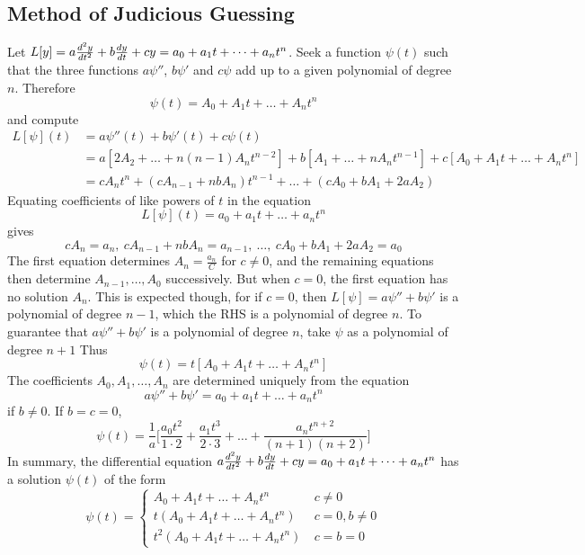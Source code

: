 \documentclass[12pt]{article}
\begin{document}
\subsection{Method of Judicious Guessing} 
Let $L[y] = a\frac{d^2y}{dt^2} + b\frac{dy}{dt} + cy = a_0 + a_1t + \dots + a_nt^n$. Seek a function $\psi(t)$ such that the three functions $a\psi''$, $b\psi'$ and $c\psi$ add up to a given polynomial of degree $n$. Therefore $$\psi(t) = A_0 + A_1t + \dots + A_nt^n$$ and compute $$\begin{aligned} L[\psi](t) &= a\psi''(t) + b\psi'(t) + c\psi(t) \\ &= a[2A_2 + \dots + n(n - 1)A_nt^{n - 2}] + b[A_1 + \dots + nA_nt^{n - 1}] + c[A_0 + A_1t + \dots + A_nt^n] \\ &= cA_nt^n + (cA_{n - 1} + nbA_n)t^{n - 1} + \dots + (cA_0 + bA_1 + 2aA_2) \end{aligned} $$ 
Equating coefficients of like powers of $t$ in the equation $$L[\psi](t) = a_0 + a_1t + \dots + a_nt^n$$ gives 
$$cA_n = a_n,~ cA_{n - 1} + nbA_n = a_{n - 1}, ~ \dots , ~ cA_0 + bA_1 + 2aA_2 = a_0 $$ 
The first equation determines $A_n = \frac{a_n}{C}$ for $c \neq 0$, and the remaining equations then determine $A_{n - 1}, \dots, A_0$ successively. But when $c = 0$, the first equation has no solution $A_n$. This is expected though, for if $c = 0$, then $L[\psi] = a\psi'' + b\psi'$ is a polynomial of degree $n - 1$, which the RHS is a polynomial of degree $n$. To guarantee that $a\psi'' + b\psi'$ is a polynomial of degree $n$, take $\psi$ as a polynomial of degree $n + 1$ Thus $$\psi(t) = t[A_0 + A_1t + \dots + A_nt^n] $$ The coefficients $A_0, A_1, \dots, A_n$ are determined uniquely from the equation $$a\psi'' + b\psi' = a_0 + a_1t + \dots + a_nt^n$$ if $b \neq 0$. If $b = c = 0$, $$\psi(t) = \frac{1}{a}\Big[ \frac{a_0t^2}{1 \cdot 2} + \frac{a_1t^3}{2 \cdot 3} + \dots + \frac{a_nt^{n + 2}}{(n + 1)(n + 2)}\Big] $$ 
In summary, the differential equation $a\frac{d^2y}{dt^2} + b\frac{dy}{dt} + cy = a_0 + a_1t + \dots + a_nt^n$ has a solution $\psi(t)$ of the form $$\psi(t) = \begin{cases} A_0 + A_1t + \dots + A_nt^n ~& c \neq 0 \\ t(A_0 + A_1t + \dots + A_nt^n) ~& c = 0, b\neq 0 \\ t^2(A_0 + A_1t + \dots + A_nt^n) ~& c = b = 0 \end{cases} $$ 
\end{document}
